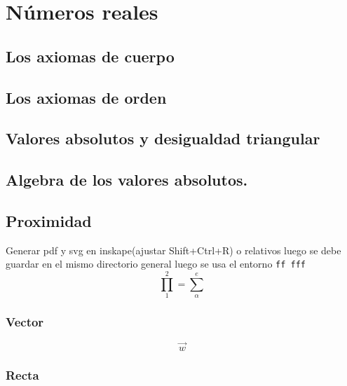 \documentclass[12pt,]{krantz}
\theoremstyle{definition}
\theoremstyle{definition}
\theoremstyle{definition}
\theoremstyle{remark}
\begin{document}
\mainmatter

\hypertarget{nuxfameros-reales}{%
\chapter{Números reales}\label{nuxfameros-reales}}

\hypertarget{los-axiomas-de-cuerpo}{%
\section{Los axiomas de cuerpo}\label{los-axiomas-de-cuerpo}}

\hypertarget{los-axiomas-de-orden}{%
\section{Los axiomas de orden}\label{los-axiomas-de-orden}}

\hypertarget{valores-absolutos-y-desigualdad-triangular}{%
\section{Valores absolutos y desigualdad triangular}\label{valores-absolutos-y-desigualdad-triangular}}

\hypertarget{algebra-de-los-valores-absolutos.}{%
\section{Algebra de los valores absolutos.}\label{algebra-de-los-valores-absolutos.}}

\hypertarget{proximidad}{%
\section{Proximidad}\label{proximidad}}

Generar pdf y svg en inskape(ajustar Shift+Ctrl+R) o relativos luego se debe guardar en el mismo directorio general luego se usa el entorno \texttt{ff\ fff}
\[\prod_1^2=\sum_{\alpha}^e\]

\hypertarget{vector}{%
\subsection{Vector}\label{vector}}

\[\vec{w}\]

\hypertarget{recta}{%
\subsection{Recta}\label{recta}}
\end{document}
